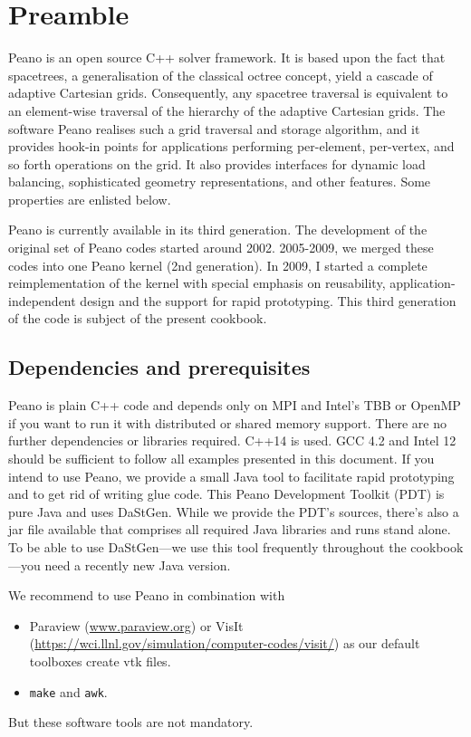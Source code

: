 \chapter{Preamble}


 Peano is an open source C++ solver framework. It is based upon the fact that spacetrees, a generalisation of the classical octree concept, yield a cascade of adaptive Cartesian grids. Consequently, any spacetree traversal is equivalent to an element-wise traversal of the hierarchy of the adaptive Cartesian grids. The software Peano realises such a grid traversal and storage algorithm, and it provides hook-in points for applications performing per-element, per-vertex, and so forth operations on the grid. It also provides interfaces for dynamic load balancing, sophisticated geometry representations, and other features. Some properties are enlisted below.

Peano is currently available in its third generation. 
The development of the original set of Peano codes started around 2002.
2005-2009, we merged these codes into one Peano kernel (2nd generation). 
In 2009, I started a complete reimplementation of the kernel with special
emphasis on reusability, application-independent design and the support for rapid prototyping. 
This third generation of the code is subject of the present cookbook.


\section*{Dependencies and prerequisites}

Peano is plain C++ code and depends only on MPI and Intel's TBB or OpenMP if you want to run it with distributed or shared memory support. 
There are no further dependencies or libraries required. 
C++14 is used. 
GCC 4.2 and Intel 12 should be sufficient to follow all examples presented in
this document.
If you intend to use Peano, we provide a small Java tool to facilitate rapid
prototyping and to get rid of writing glue code. 
This Peano Development Toolkit (PDT) is pure Java and uses DaStGen. 
While we provide the PDT's sources, there's also a jar file available that comprises all required Java libraries and runs stand alone.
To be able to use DaStGen---we use this tool frequently throughout the
cookbook---you need a recently new Java version.


We recommend to use Peano in combination with
\begin{itemize}
  \item Paraview (\url{www.paraview.org}) or VisIt
  (\url{https://wci.llnl.gov/simulation/computer-codes/visit/}) as our default
  toolboxes create vtk files.
  \item \texttt{make} and \texttt{awk}.
\end{itemize}
But these software tools are not mandatory.


